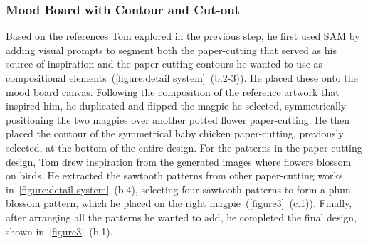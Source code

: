 \subsubsection{Mood Board with Contour and Cut-out}


Based on the references Tom explored in the previous step, he first used SAM by adding visual prompts to segment both the paper-cutting that served as his source of inspiration and the paper-cutting contours he wanted to use as compositional elements~(\autoref{figure:detail system}~(b.2-3)). He placed these onto the mood board canvas. Following the composition of the reference artwork that inspired him, he duplicated and flipped the magpie he selected, symmetrically positioning the two magpies over another potted flower paper-cutting. He then placed the contour of the symmetrical baby chicken paper-cutting, previously selected, at the bottom of the entire design.
For the patterns in the paper-cutting design, Tom drew inspiration from the generated images where flowers blossom on birds. He extracted the sawtooth patterns from other paper-cutting works in~\autoref{figure:detail system}~(b.4), selecting four sawtooth patterns to form a plum blossom pattern, which he placed on the right magpie~(\autoref{figure3}~(c.1)).
Finally, after arranging all the patterns he wanted to add, he completed the final design, shown in~\autoref{figure3}~(b.1).

